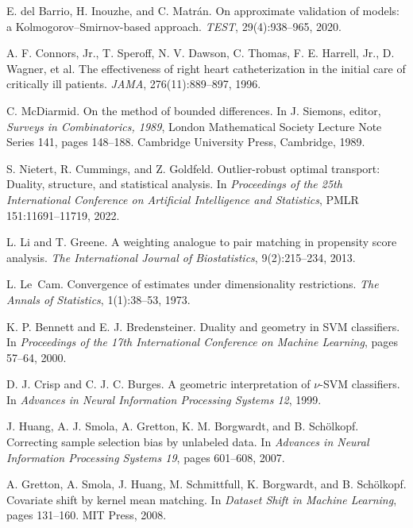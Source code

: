 E. del Barrio, H. Inouzhe, and C. Matr\'an.
\newblock On approximate validation of models: a Kolmogorov--Smirnov-based approach.
\newblock \emph{TEST}, 29(4):938--965, 2020.

A. F. Connors, Jr., T. Speroff, N. V. Dawson, C. Thomas, F. E. Harrell, Jr., D. Wagner, et al.
\newblock The effectiveness of right heart catheterization in the initial care of critically ill patients.
\newblock \emph{JAMA}, 276(11):889--897, 1996.

C. McDiarmid.
\newblock On the method of bounded differences.
\newblock In J. Siemons, editor, \emph{Surveys in Combinatorics, 1989}, London Mathematical Society Lecture Note Series 141, pages 148--188. Cambridge University Press, Cambridge, 1989.

S. Nietert, R. Cummings, and Z. Goldfeld.
\newblock Outlier-robust optimal transport: Duality, structure, and statistical analysis.
\newblock In \emph{Proceedings of the 25th International Conference on Artificial Intelligence and Statistics}, PMLR 151:11691--11719, 2022.

L. Li and T. Greene.
\newblock A weighting analogue to pair matching in propensity score analysis.
\newblock \emph{The International Journal of Biostatistics}, 9(2):215--234, 2013.

L. Le~Cam.
\newblock Convergence of estimates under dimensionality restrictions.
\newblock \emph{The Annals of Statistics}, 1(1):38--53, 1973.

K. P. Bennett and E. J. Bredensteiner.
\newblock Duality and geometry in {SVM} classifiers.
\newblock In \emph{Proceedings of the 17th International Conference on Machine Learning}, pages 57--64, 2000.

D. J. Crisp and C. J. C. Burges.
\newblock A geometric interpretation of $\nu$-{SVM} classifiers.
\newblock In \emph{Advances in Neural Information Processing Systems 12}, 1999.

J. Huang, A. J. Smola, A. Gretton, K. M. Borgwardt, and B. Sch{\"o}lkopf.
\newblock Correcting sample selection bias by unlabeled data.
\newblock In \emph{Advances in Neural Information Processing Systems 19}, pages 601--608, 2007.

A. Gretton, A. Smola, J. Huang, M. Schmittfull, K. Borgwardt, and B. Sch{\"o}lkopf.
\newblock Covariate shift by kernel mean matching.
\newblock In \emph{Dataset Shift in Machine Learning}, pages 131--160. MIT Press, 2008.

